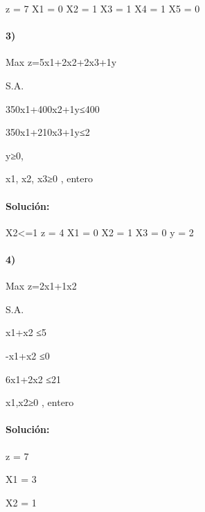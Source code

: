 \documentclass[11pt]{article}
\begin{document}
z = 7 X1 = 0 X2 = 1 X3 = 1 X4 = 1 X5 = 0

\paragraph{3)}\label{section-2}

Max z=5x1+2x2+2x3+1y

S.A.

350x1+400x2+1y≤400

350x1+210x3+1y≤2

y≥0,

x1, x2, x3≥0 , entero

\paragraph{Solución:}\label{soluciuxf3n-2}

X2\textless{}=1 z = 4 X1 = 0 X2 = 1 X3 = 0 y = 2

\paragraph{4)}\label{section-3}

Max z=2x1+1x2

S.A.

x1+x2 ≤5

-x1+x2 ≤0

6x1+2x2 ≤21

x1,x2≥0 , entero

\paragraph{Solución:}\label{soluciuxf3n-3}

z = 7

X1 = 3

X2 = 1


    
    
    
    
\end{document}
